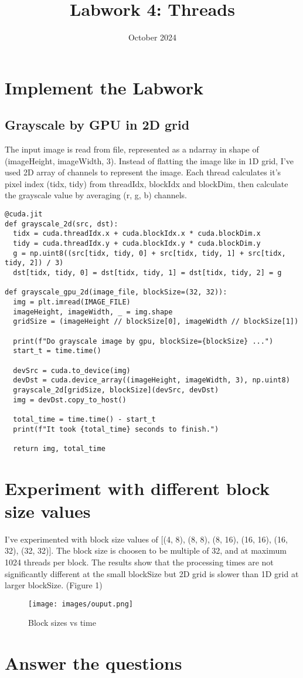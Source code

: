 \documentclass{article}
\begin{document}
\title{Labwork 4: Threads}
\date{October 2024}

\section{Implement the Labwork}
\subsection{Grayscale by GPU in 2D grid}
The input image is read from file, represented as a ndarray in shape of (imageHeight, imageWidth, 3).
Instead of flatting the image like in 1D grid, I've used 2D array of channels to represent the image.
Each thread calculates it's pixel index (tidx, tidy) from threadIdx, blockIdx and blockDim, then calculate the grayscale value by averaging (r, g, b) channels.

\begin{verbatim}
@cuda.jit
def grayscale_2d(src, dst):
  tidx = cuda.threadIdx.x + cuda.blockIdx.x * cuda.blockDim.x
  tidy = cuda.threadIdx.y + cuda.blockIdx.y * cuda.blockDim.y
  g = np.uint8((src[tidx, tidy, 0] + src[tidx, tidy, 1] + src[tidx, tidy, 2]) / 3)
  dst[tidx, tidy, 0] = dst[tidx, tidy, 1] = dst[tidx, tidy, 2] = g

def grayscale_gpu_2d(image_file, blockSize=(32, 32)):
  img = plt.imread(IMAGE_FILE)
  imageHeight, imageWidth, _ = img.shape
  gridSize = (imageHeight // blockSize[0], imageWidth // blockSize[1])

  print(f"Do grayscale image by gpu, blockSize={blockSize} ...")
  start_t = time.time()

  devSrc = cuda.to_device(img)
  devDst = cuda.device_array((imageHeight, imageWidth, 3), np.uint8)
  grayscale_2d[gridSize, blockSize](devSrc, devDst)
  img = devDst.copy_to_host()

  total_time = time.time() - start_t
  print(f"It took {total_time} seconds to finish.")

  return img, total_time
\end{verbatim}

\section{Experiment with different block size values}
I've experimented with block size values of [(4, 8), (8, 8), (8, 16), (16, 16), (16, 32), (32, 32)].
The block size is choosen to be multiple of 32, and at maximum 1024 threads per block.
The results show that the processing times are not significantly different at the small blockSize but 2D grid is slower than 1D grid at larger blockSize. (Figure 1)
\begin{figure}
    \centering
    \texttt{[image: images/ouput.png]}
    \caption{Block sizes vs time}
    \label{fig:enter-label}
\end{figure}


\section{Answer the questions}
\end{document}
